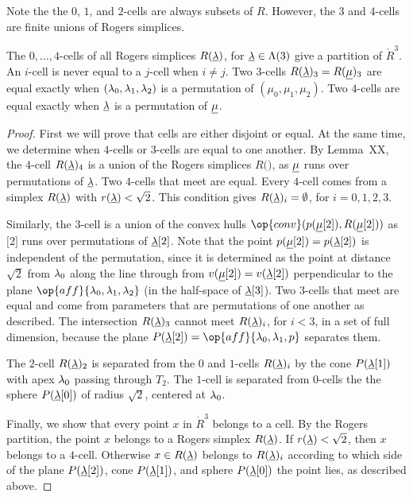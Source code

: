 Note the the $0$, $1$, and $2$-cells are always subsets of $R$.  However, the $3$ and
$4$-cells are finite unions of Rogers simplices.

\begin{lemma}  The $0,\ldots,4$-cells of all Rogers simplices $R({\underline{\lambda}})$, for ${\underline{\lambda}}\in \Lambda(3)$
give a partition of $\ring{R}^3$.  An $i$-cell is never equal to a $j$-cell when $i\ne j$.
Two $3$-cells $R({\underline{\lambda}})_3 = R({\underline{\mu}})_3$ are equal exactly when
$(\lambda_0,\lambda_1,\lambda_2)$ is a permutation of $(\mu_0,\mu_1,\mu_2)$.  Two $4$-cells are
equal exactly when ${\underline{\lambda}}$ is a permutation of ${\underline{\mu}}$.
\end{lemma}

\begin{proof}  First we will prove that cells are either disjoint or equal.  At the same
time, we determine when $4$-cells or $3$-cells are equal to one another.
By Lemma~XX, the $4$-cell $R({\underline{\lambda}})_4$ is a union of the Rogers simplices
$R(\bm)$, as ${\underline{\mu}}$ runs over permutations of ${\underline{\lambda}}$. 
 Two $4$-cells
that meet are equal. 
Every $4$-cell comes from a simplex
$R({\underline{\lambda}})$ with $r({\underline{\lambda}})<\sqrt2$.  This condition gives $R({\underline{\lambda}})_i=\emptyset$, for $i=0,1,2,3$.

Similarly, the $3$-cell is a union
of the convex hulls $\op{conv}(p(\bm[2]),R(\bm[2]))$ as $\bm[2]$ runs over permutations of ${\underline{\lambda}}[2]$.  Note that the point $p({\underline{\mu}}[2])=p({\underline{\lambda}}[2])$ is independent of the permutation, since
it is determined as the point at distance $\sqrt2$ from $\lambda_0$ along the line through
from $v({\underline{\mu}}[2])=v({\underline{\lambda}}[2])$ perpendicular to the plane $\op{aff}\{\lam_0,\lam_1,\lam_2\}$
(in the half-space of ${\underline{\lambda}}[3]$). Two $3$-cells that meet are equal and come from parameters that are permutations of
one another as described.   The intersection $R({\underline{\lambda}})_3$ cannot meet $R({\underline{\lambda}})_i$, for $i<3$, in
a set of full dimension, because the plane $P(\bl[2])=\op{aff}\{\lam_0,\lam_1,p\}$ separates them.

The $2$-cell $R({\underline{\lambda}})_2$ is separated from the $0$ and $1$-cells $R({\underline{\lambda}})_i$
by the cone $P({\underline{\lambda}}[1])$ with apex $\lambda_0$
passing through $T_2$. The $1$-cell is separated from $0$-cells the the sphere $P({\underline{\lambda}}[0])$
of radius
$\sqrt2$, centered at $\lambda_0$.

Finally, we show that every point $x$ in $\ring{R}^3$ belongs to a cell.  By the Rogers
partition, the point $x$ belongs to a Rogers simplex $R({\underline{\lambda}})$.  If $r({\underline{\lambda}})<\sqrt2$, then
$x$ belongs to a $4$-cell.  Otherwise $x\in R({\underline{\lambda}})$ belongs to $R({\underline{\lambda}})_i$ according to
which side of the plane $P({\underline{\lambda}}[2])$, cone $P({\underline{\lambda}}[1])$, and sphere $P({\underline{\lambda}}[0])$ the point
lies, as described above.
\end{proof}


